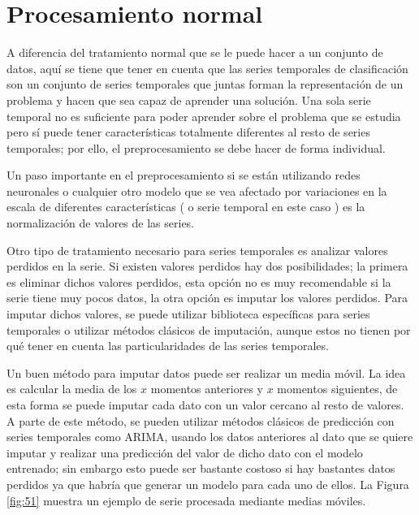 \section{Procesamiento normal}
A diferencia del tratamiento normal que se le puede hacer a  un conjunto de datos, aquí se tiene que tener en cuenta que las series temporales de clasificación son un conjunto de series temporales que juntas forman la representación de un problema y hacen que sea capaz de aprender una solución. Una sola serie temporal no es suficiente para poder aprender sobre el problema que se estudia pero sí puede tener características totalmente diferentes al resto de series temporales; por ello, el preprocesamiento se debe hacer de forma individual.\newline

Un paso importante en el preprocesamiento si se están utilizando redes neuronales o cualquier otro modelo que se vea afectado por variaciones en la escala de diferentes características ( o serie temporal en este caso ) es la normalización de valores de las series.\newline

Otro tipo de tratamiento necesario para series temporales es analizar valores perdidos en la serie. Si existen valores perdidos hay dos posibilidades; la primera es eliminar dichos valores perdidos, esta opción no es muy recomendable si la serie tiene muy pocos datos, la otra opción es imputar los valores perdidos. Para imputar dichos valores, se puede utilizar biblioteca específicas para series temporales o utilizar métodos clásicos de imputación, aunque estos no tienen por qué tener en cuenta las particularidades de las series temporales.\newline

Un buen método para imputar datos puede ser realizar un media móvil. La idea es calcular la media de los $x$ momentos anteriores y $x$ momentos siguientes, de esta forma se puede imputar cada dato con un valor cercano al resto de valores. A parte de este método, se pueden utilizar métodos clásicos de predicción con series temporales como ARIMA, usando los datos anteriores al dato que se quiere imputar y realizar una predicción del valor de dicho dato con el modelo entrenado; sin embargo esto puede ser bastante costoso si hay bastantes datos perdidos ya que habría que generar un modelo para cada uno de ellos. La Figura \ref{fig:51} muestra un ejemplo de serie procesada mediante medias móviles.\newline

